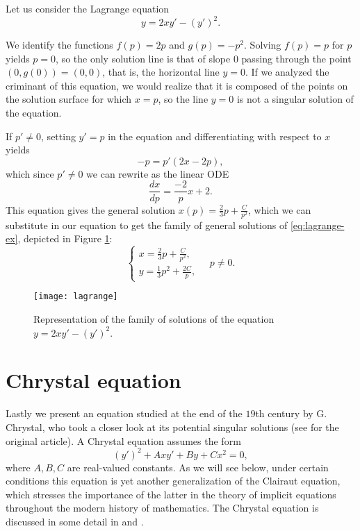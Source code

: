 \begin{example} Let us consider the Lagrange equation
  \begin{equation}\label{eq:lagrange-ex}
    y=2xy'-(y')^2.
  \end{equation}

We identify the functions $f(p)=2p$ and $g(p)=-p^2$. Solving $f(p)=p$ for $p$ yields $p=0$, so the only solution line is that of slope $0$ passing through the point $(0,g(0))=(0,0)$, that is, the horizontal line $y=0$. If we analyzed the criminant of this equation, we would realize that it is composed of the points on the solution surface for which $x=p$, so the line $y=0$ is not a singular solution of the equation.

If $p'\neq 0$, setting $y'=p$ in the equation and differentiating with respect to $x$ yields
\[
-p=p'(2x-2p),
\]
which since $p'\neq 0$ we can rewrite as the linear ODE
\[
\frac{dx}{dp}= \frac{-2}{p}x + 2.
\]
This equation gives the general solution $x(p)=\frac{2}{3}p+\frac{C}{p^2}$, which we can substitute in our equation to get the family of general solutions of \eqref{eq:lagrange-ex}, depicted in Figure \ref{fig:lagrange}:
\[
\begin{cases}
  \displaystyle x=\frac{2}{3}p+\frac{C}{p^2},\\
  \displaystyle y=\frac{1}{3}p^2+\frac{2C}{p},
\end{cases}\quad p \neq 0.
\]

\begin{figure}[h!]
\centering
\texttt{[image: lagrange]}
\caption{Representation of the family of solutions of the equation $y=2xy'-(y')^2$.}
\label{fig:lagrange}
\end{figure}

\end{example}

\section{Chrystal equation}

Lastly we present an equation studied at the end of the $19$th century by G. Chrystal, who took a closer look at its potential singular solutions (see \cite{chrystal1897discriminant} for the original article). A Chrystal equation assumes the form
\begin{equation} \label{eq:chrystal}
  (y')^2 + Axy' + By + Cx^2=0,
\end{equation}
where $A,B,C$ are real-valued constants. As we will see below, under certain conditions this equation is yet another generalization of the Clairaut equation, which stresses the importance of the latter in the theory of implicit equations throughout the modern history of mathematics. The Chrystal equation is discussed in some detail in \cite{ince1956ordinary} and \cite{davis1962introduction}.


